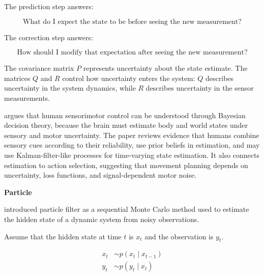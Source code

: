 \documentclass{book}
\providecommand{\ProjectDeepHeading}[2]{%
    \par\medskip\noindent\textbf{#2}\par\smallskip
}
\begin{document}
        The prediction step answers:
        
        \[
            \text{What do I expect the state to be before seeing the new measurement?}
        \]
        
        The correction step answers:
        
        \[
            \text{How should I modify that expectation after seeing the new measurement?}
        \]
        
        The covariance matrix \(P\) represents uncertainty about the state estimate.
        The matrices \(Q\) and \(R\) control how uncertainty enters the system: \(Q\) describes uncertainty in the system dynamics, while \(R\) describes uncertainty in the sensor measurements.


\cite{wolpert-2007-probabilistic-models-in-human-sensorimotor-control} argues that human sensorimotor control can be understood through Bayesian decision theory, because the brain must estimate body and world states under sensory and motor uncertainty. The paper reviews evidence that humans combine sensory cues according to their reliability, use prior beliefs in estimation, and may use Kalman-filter-like processes for time-varying state estimation. It also connects estimation to action selection, suggesting that movement planning depends on uncertainty, loss functions, and signal-dependent motor noise.

\ProjectDeepHeading{8}{Particle}


\cite{gordon-1993-novel-approach-to-nonlinear-non-gaussian-bayesian-state-estimation} introduced particle filter as a sequential Monte Carlo method used to estimate the hidden state of a dynamic system from noisy observations.
    
    Assume that the hidden state at time $t$ is $x_t$ and the observation is $y_t$.
    
    \begin{align}
        x_t &\sim p(x_t \mid x_{t-1}) \\
        y_t &\sim p(y_t \mid x_t)
    \end{align}
    
\end{document}
